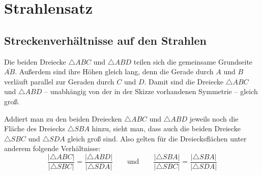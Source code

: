 \documentclass
[
  draft    = true,
  fontsize = 11pt,
  parskip  = half-,
  BCOR     = 0pt,
  DIV      = 11
]
{scrartcl}
\begin{document}
%
%
\newcommand{\strahlensatz}
{
  \draw (S1E) -- (S) -- (S2E);
  \draw (P1A) -- (P1E);
  \draw (P2A) -- (P2E);
}

\section*{Strahlensatz}

\subsection*{Streckenverhältnisse auf den Strahlen}
Die beiden Dreiecke $\triangle ABC$ und $\triangle ABD$ teilen sich die
gemeinsame Grundseite $\overline{AB}$. Außerdem sind ihre Höhen gleich lang,
denn die Gerade durch $A$ und $B$ verläuft parallel zur Geraden durch $C$
und $D$. Damit sind die Dreiecke $\triangle ABC$ und $\triangle ABD$
-- unabhängig von der in der Skizze vorhandenen Symmetrie -- gleich groß.
\begin{center}
\end{center}
Addiert man zu den beiden Dreiecken $\triangle ABC$ und $\triangle ABD$
jeweils noch die Fläche des Dreiecks $\triangle SBA$ hinzu, sieht man, dass
auch die beiden Dreiecke $\triangle SBC$ und $\triangle SDA$ gleich groß
sind. Also gelten für die Dreiecksflächen unter anderem folgende Verhältnisse:
\begin{equation*}
  \frac{\left|\triangle ABC\right|}{\left|\triangle SBC\right|}
  =
  \frac{\left|\triangle ABD\right|}{\left|\triangle SDA\right|}
  \qquad
  \text{und}
  \qquad
  \frac{\left|\triangle SBA\right|}{\left|\triangle SBC\right|}
  =
  \frac{\left|\triangle SBA\right|}{\left|\triangle SDA\right|}
\end{equation*}
\end{document}
